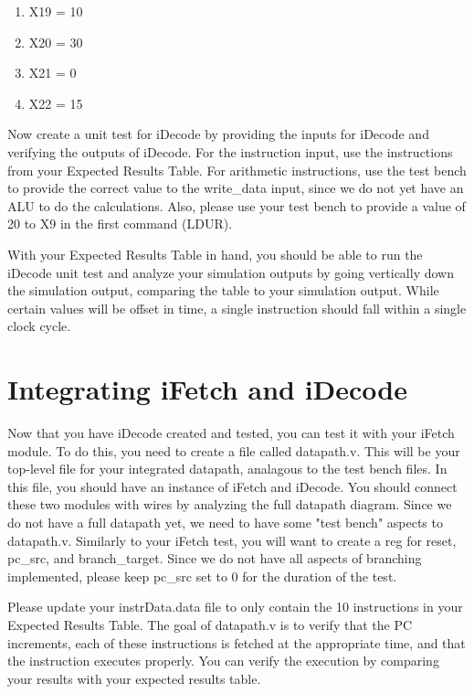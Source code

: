 \begin{enumerate}
	\item X19 = 10
	\item X20 = 30
	\item X21 = 0
	\item X22 = 15
\end{enumerate}

Now create a unit test for iDecode by providing the inputs for iDecode and verifying the outputs of iDecode.  For the instruction input, use the instructions from your Expected Results Table.  For arithmetic instructions, use the test bench to provide the correct value to the write\_data input, since we do not yet have an ALU to do the calculations.  Also, please use your test bench to provide a value of 20 to X9 in the first command (LDUR).

With your Expected Results Table in hand, you should be able to run the iDecode unit test and analyze your simulation outputs by going vertically down the simulation output, comparing the table to your simulation output.  While certain values will be offset in time, a single instruction should fall within a single clock cycle.  

\section{Integrating iFetch and iDecode}
Now that you have iDecode created and tested, you can test it with your iFetch module.  To do this, you need to create a file called datapath.v.  This will be your top-level file for your integrated datapath, analagous to the test bench files.  In this file, you should have an instance of iFetch and iDecode.  You should connect these two modules with wires by analyzing the full datapath diagram.  Since we do not have a full datapath yet, we need to have some "test bench" aspects to datapath.v.  Similarly to your iFetch test, you will want to create a reg for reset, pc\_src, and branch\_target.  Since we do not have all aspects of branching implemented, please keep pc\_src set to 0 for the duration of the test.  

Please update your instrData.data file to only contain the 10 instructions in your Expected Results Table.  The goal of datapath.v is to verify that the PC increments, each of these instructions is fetched at the appropriate time, and that the instruction executes properly.  You can verify the execution by comparing your results with your expected results table.     

